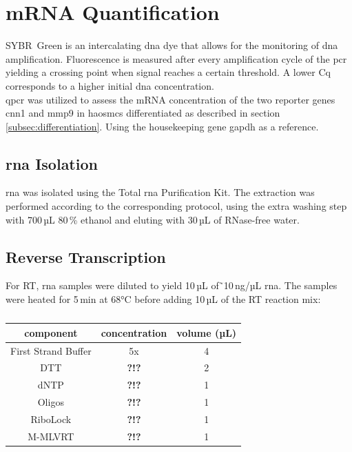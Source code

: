 \section{mRNA Quantification}
\label{sec:qpcr}
SYBR\textregistered~Green is an intercalating \ac{dna} dye that allows for the monitoring of \ac{dna} amplification. Fluorescence is measured after every amplification cycle of the \ac{pcr} yielding a crossing point when signal reaches a certain threshold. A lower \ac{Cq} corresponds to a higher initial \ac{dna} concentration. \cite{huggettStandardisationReportingNucleic2011}\\
\Ac{qpcr} was utilized to assess the \ac{mRNA} concentration of the two reporter genes \ac{cnn1} and \ac{mmp9} in \acp{haosmc} differentiated as described in section \ref{subsec:differentiation}. Using the housekeeping gene \ac{gapdh} as a reference.


    \subsection{\ac{rna} Isolation}
    \ac{rna} was isolated using the Total \ac{rna} Purification Kit. The extraction was performed according to the corresponding protocol, using the extra washing step with 700\,µL 80\,\% ethanol and eluting with 30\,µL of RNase-free water.

    \subsection{Reverse Transcription}
    For \ac{RT}, \ac{rna} samples were diluted to yield 10\,µL of \~\,10\,ng/µL \ac{rna}. The samples were heated for 5\,min at 68°C before adding 10\,µL of the \ac{RT} reaction mix:

    \begin{table}[h]
    \capstart
	\centering
	\begin{minipage}{\captionwidth}
	   	\caption[RT mastermix]{}
	   	\label{tab:RT Mastr Mix}
	\end{minipage}
    \begin{tabular}{|c|c|c|}
        \hline
        component               & concentration & volume (µL) \\ \hline
        First Strand Buffer     & 5x            & 4           \\
        \acs{DTT}               &\textbf{\color{red} ?!?}               & 2           \\
        \acs{dNTP}              &\textbf{\color{red} ?!?}               & 1           \\
        Oligos                  &\textbf{\color{red} ?!?}               & 1           \\
        RiboLock                &\textbf{\color{red} ?!?}               & 1           \\
        M-MLVRT                 &\textbf{\color{red} ?!?}               & 1           \\ \hline
    \end{tabular}
    \end{table}

